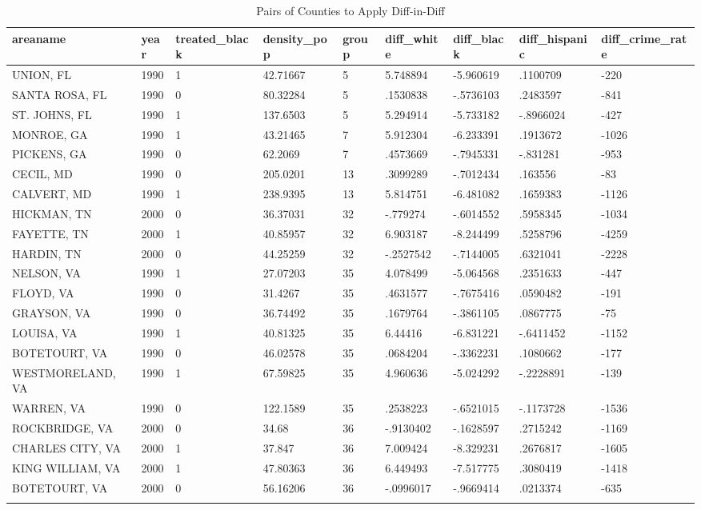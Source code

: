 \documentclass{article}
\begin{document}
\begin{table}[tbp] \centering%
\caption{Pairs of Counties to Apply Diff-in-Diff}%
\begin{tabularx}{\textwidth}{lCCCCCCCC}
\toprule
areaname&year&treated\_black&density\_pop&group&diff\_white&diff\_black&diff\_hispanic&diff\_crime\_rate \tabularnewline
\midrule\addlinespace[1.5ex]
UNION, FL&1990&1&42.71667&5&5.748894&-5.960619&.1100709&-220 \tabularnewline
SANTA ROSA, FL&1990&0&80.32284&5&.1530838&-.5736103&.2483597&-841 \tabularnewline
ST. JOHNS, FL&1990&1&137.6503&5&5.294914&-5.733182&-.8966024&-427 \tabularnewline
MONROE, GA&1990&1&43.21465&7&5.912304&-6.233391&.1913672&-1026 \tabularnewline
PICKENS, GA&1990&0&62.2069&7&.4573669&-.7945331&-.831281&-953 \tabularnewline
CECIL, MD&1990&0&205.0201&13&.3099289&-.7012434&.163556&-83 \tabularnewline
CALVERT, MD&1990&1&238.9395&13&5.814751&-6.481082&.1659383&-1126 \tabularnewline
HICKMAN, TN&2000&0&36.37031&32&-.779274&-.6014552&.5958345&-1034 \tabularnewline
FAYETTE, TN&2000&1&40.85957&32&6.903187&-8.244499&.5258796&-4259 \tabularnewline
HARDIN, TN&2000&0&44.25259&32&-.2527542&-.7144005&.6321041&-2228 \tabularnewline
NELSON, VA&1990&1&27.07203&35&4.078499&-5.064568&.2351633&-447 \tabularnewline
FLOYD, VA&1990&0&31.4267&35&.4631577&-.7675416&.0590482&-191 \tabularnewline
GRAYSON, VA&1990&0&36.74492&35&.1679764&-.3861105&.0867775&-75 \tabularnewline
LOUISA, VA&1990&1&40.81325&35&6.44416&-6.831221&-.6411452&-1152 \tabularnewline
BOTETOURT, VA&1990&0&46.02578&35&.0684204&-.3362231&.1080662&-177 \tabularnewline
WESTMORELAND, VA&1990&1&67.59825&35&4.960636&-5.024292&-.2228891&-139 \tabularnewline
WARREN, VA&1990&0&122.1589&35&.2538223&-.6521015&-.1173728&-1536 \tabularnewline
ROCKBRIDGE, VA&2000&0&34.68&36&-.9130402&-.1628597&.2715242&-1169 \tabularnewline
CHARLES CITY, VA&2000&1&37.847&36&7.009424&-8.329231&.2676817&-1605 \tabularnewline
KING WILLIAM, VA&2000&1&47.80363&36&6.449493&-7.517775&.3080419&-1418 \tabularnewline
BOTETOURT, VA&2000&0&56.16206&36&-.0996017&-.9669414&.0213374&-635 \tabularnewline
\bottomrule \addlinespace[1.5ex]
\end{tabularx}%
\end{table}%
\end{document}
